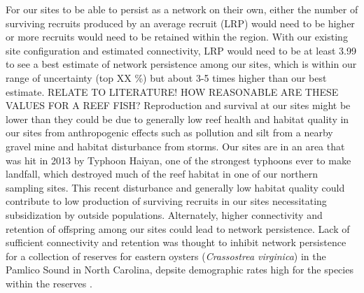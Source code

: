 \documentclass[12pt, oneside]{article}   	%
\begin{document}
For our sites to be able to persist as a network on their own, either the number of surviving recruits produced by an average recruit (LRP) would need to be higher or more recruits would need to be retained within the region. With our existing site configuration and estimated connectivity, LRP would need to be at least 3.99 to see a best estimate of network persistence among our sites, which is within our range of uncertainty (top XX \%) but about 3-5 times higher than our best estimate. RELATE TO LITERATURE! HOW REASONABLE ARE THESE VALUES FOR A REEF FISH? Reproduction and survival at our sites might be lower than they could be due to generally low reef health and habitat quality in our sites from anthropogenic effects such as pollution and silt from a nearby gravel mine and habitat disturbance from storms. Our sites are in an area that was hit in 2013 by Typhoon Haiyan, one of the strongest typhoons ever to make landfall, which destroyed much of the reef habitat in one of our northern sampling sites. This recent disturbance and generally low habitat quality could contribute to low production of surviving recruits in our sites \citep[seen in other populations with low habitat quality, e.g.][]{hayashi2019low} necessitating subsidization by outside populations. Alternately, higher connectivity and retention of offspring among our sites could lead to network persistence. Lack of sufficient connectivity and retention was thought to inhibit network persistence for a collection of reserves for eastern oysters (\textit{Crassostrea virginica}) in the Pamlico Sound in North Carolina, depsite demographic rates high for the species within the reserves \citep{puckett2016metapopulation}. %

\end{document}
